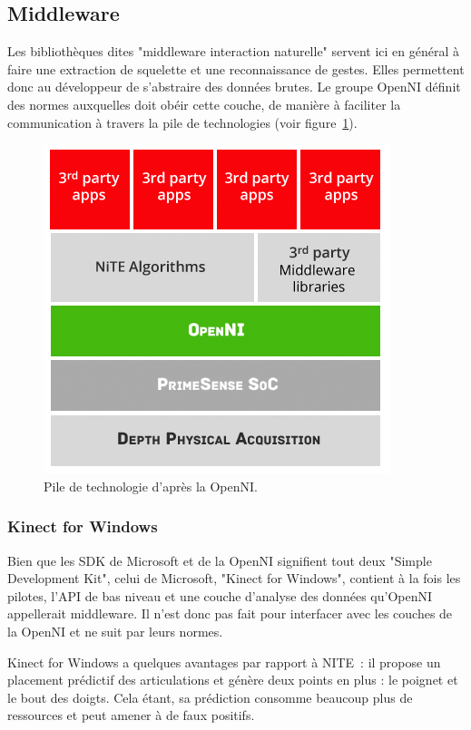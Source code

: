 
\subsection{Middleware}
Les bibliothèques dites "middleware interaction naturelle" servent ici en 
général à faire une 
extraction de squelette et une reconnaissance de gestes. Elles permettent donc 
au développeur de s'abstraire des données brutes. Le groupe OpenNI définit 
des normes auxquelles doit obéir cette couche, de 
manière à faciliter la communication à travers la pile de technologies (voir 
figure~\ref{fig:openni_technology_stack}).
\begin{figure}[h!]
\centering
\includegraphics[width=0.7\linewidth]{images/openni_technology_stack}
\caption{Pile de technologie d'après la OpenNI.}
\label{fig:openni_technology_stack}
\end{figure}


\subsubsection{Kinect for Windows}  
Bien que les SDK de Microsoft et de la OpenNI signifient tout deux 
"Simple Development Kit",
celui de Microsoft, "Kinect for Windows", contient à la fois les pilotes, 
l'API de bas niveau et une couche d'analyse des données qu'OpenNI appellerait 
middleware. Il n'est donc pas fait pour interfacer avec les couches de la 
OpenNI et ne suit par leurs normes.

Kinect for Windows a quelques avantages par rapport à NITE~: il propose un
placement prédictif des articulations et génère deux points en plus :
le poignet et le bout des doigts. Cela étant, sa prédiction consomme beaucoup 
plus de ressources et peut amener à de faux positifs\cite{microsoft_vs_openni}.

